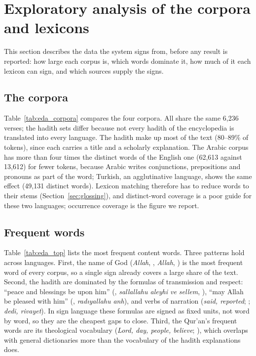 \chapter{Exploratory analysis of the corpora and lexicons}
\label{sec:eda}

This section describes the data the system signs from, before any result is reported: how large each corpus is,
which words dominate it, how much of it each lexicon can sign, and which sources supply the signs.

\section{The corpora}
Table~\ref{tab:eda_corpora} compares the four corpora. All share the same 6,236 verses; the hadith sets differ because
not every hadith of the encyclopedia is translated into every language. The hadith make up most of the text (80--89\% of
tokens), since each carries a title and a scholarly explanation. The Arabic corpus has more than four times the distinct
words of the English one (62,613 against 13,612) for fewer tokens, because Arabic writes conjunctions, prepositions and
pronouns as part of the word; Turkish, an agglutinative language, shows the same effect (49,131 distinct words). Lexicon
matching therefore has to reduce words to their stems (Section~\ref{sec:glossing}), and distinct-word coverage is a poor
guide for these two languages; occurrence coverage is the figure we report.



\section{Frequent words}
Table~\ref{tab:eda_top} lists the most frequent content words. Three patterns hold across languages. First, the name of
God (\emph{Allah}, , \emph{Allah}, ) is the most frequent word of every corpus, so a single sign
already covers a large share of the text. Second, the hadith are dominated by the formulas of transmission and respect:
``peace and blessings be upon him'' (, \emph{sallallahu aleyhi ve sellem}, ), ``may Allah be
pleased with him'' (, \emph{rad\i{}yallahu anh}), and verbs of narration (\emph{said, reported};
; \emph{dedi, rivayet}). In sign language these formulas are signed as fixed units, not word by word, so they are
the cheapest gaps to close. Third, the Qur'an's frequent words are its theological vocabulary (\emph{Lord, day, people,
believe}; ), which overlaps with general dictionaries more than the vocabulary of the hadith
explanations does.

